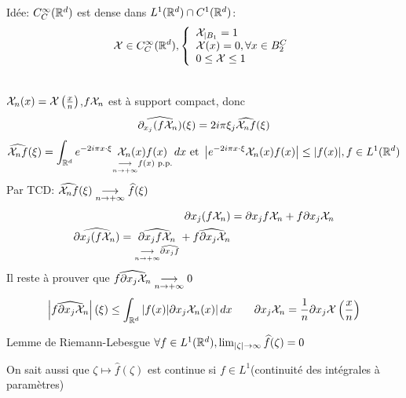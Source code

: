 \documentclass[]{report}
\begin{document}
    Idée: $C_C^\infty(\mathbb{R}^d)$ est dense dans $L^1(\mathbb{R}^d)\cap C^1(\mathbb{R}^d)$:\\
    \[\mathcal{X}\in C_C^\infty(\mathbb{R}^d),\left\{\begin{array}{ll} \mathcal{X}_{|B_1}=1\\ \mathcal{X}(x)=0,\forall x\in B_2^C\\ 0\le \mathcal{X}\le 1 \end{array} \right.\]
    \\
    $\mathcal{X}_n(x)=\mathcal{X}\left(\frac{x}{n}\right)$,$f\mathcal{X}_n$ est à support compact, donc
    \[\widehat{\partial_{x_j}(f \mathcal{X}_n)}(\xi)=2i\pi \xi_j \widehat{\mathcal{X}_n f}(\xi)\]
    \[\widehat{\mathcal{X}_n f}(\xi)=\int_{\mathbb{R}^d}e^{-2i\pi x\cdot \xi}\underset{\underset{n\to +\infty}{\longrightarrow} f(x)\text{ p.p.}}{\mathcal{X}_n(x)f(x)}\, dx\text{ et }\left|e^{-2i\pi x\cdot \xi}\mathcal{X}_n(x)f(x)\right|\le |f(x)|,f\in L^1(\mathbb{R}^d)\]
    Par TCD: $\widehat{\mathcal{X}_n f}(\xi)\underset{n\to +\infty}{\longrightarrow} \widehat{f}(\xi)$
    \begin{align*}
        \partial x_j(f\mathcal{X}_n)&=\partial x_j f\mathcal{X}_n+f\partial x_j \mathcal{X}_n\\
        \widehat{\partial x_j(f\mathcal{X}_n)}=\underset{\underset{n\to +\infty}{\longrightarrow} \widehat{\partial x_j f}}{\widehat{\partial x_j f \mathcal{X}_n}}+\widehat{f \partial x_j \mathcal{X}_n}
    \end{align*}
    Il reste à prouver que $\widehat{f\partial x_j \mathcal{X}_n}\underset{n\to +\infty}{\longrightarrow} 0$
    \[\left|\widehat{f\partial x_j\mathcal{X}_n}\right|(\xi)\le \int_{\mathbb{R}^d}|f(x)|\partial x_j \mathcal{X}_n(x)|\, dx\qquad \partial x_j \mathcal{X}_n=\frac{1}{n}\partial x_j \mathcal{X}\left(\frac{x}{n}\right)\]

    \begin{prop}{Lemme de Riemann-Lebesgue}{}
        $\forall f\in L^1(\mathbb{R}^d), \lim_{|\zeta|\to \infty}\widehat{f}(\zeta)=0$
    \end{prop}

    \begin{re}{}{}
        On sait aussi que $\zeta\mapsto \widehat{f}(\zeta)$ est continue si $f\in L^1$(continuité des intégrales à paramètres)
    \end{re}
\end{document}

